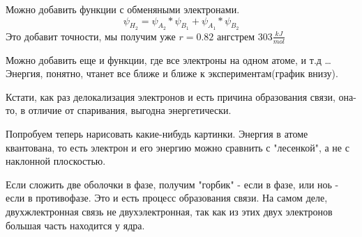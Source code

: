 \documentclass[11pt]{article}
\begin{document}
Можно добавить функции с обменяными электронами.
$$\psi_{H_2} = \psi_{A_2}*\psi_{B_1} + \psi_{A_1}*\psi_{B_2} $$
 Это добавит точности, мы получим уже $r=0.82$ ангстрем $303 \frac{kJ}{mol}$

Можно добавить еще и функции, где все электроны на одном атоме, и т.д \ldots Энергия, понятно, чтанет все ближе и ближе к экспериментам(график внизу).

Кстати, как раз делокализация электронов и есть причина образования связи, она-то, в отличие от спаривания, выгодна энергетически.

Попробуем теперь нарисовать какие-нибудь картинки. Энергия в атоме квантована, то есть электрон и его энергию можно сравнить с "лесенкой",  а не с наклонной плоскостью.


Если сложить две оболочки в фазе, получим "горбик" - если в фазе, или ноь - если в противофазе. Это и есть процесс образования связи. На самом деле, двухжлектронная связь не двухэлектронная, так как из этих двух электронов большая часть находится у ядра.
\end{document}
